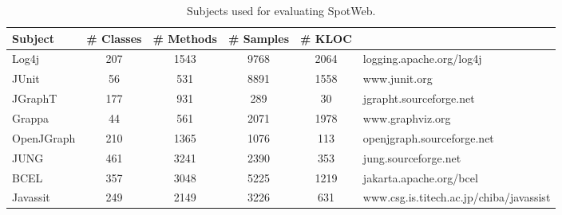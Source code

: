 \setlength{\tabcolsep}{1pt}
\begin{table}[t]
\begin{CodeOut}
\begin{center}
\begin {tabular} {|l|c|c|c|c|l|}
\hline
Subject&\# Classes&\# Methods&\# Samples&\# KLOC&\CenterCell{URL}\\
\hline Log4j&207&1543&9768&2064&logging.apache.org/log4j\\
\hline JUnit&56&531&8891&1558&www.junit.org\\
\hline JGraphT&177&931&289&30&jgrapht.sourceforge.net\\
\hline Grappa&44&561&2071&1978&www.graphviz.org\\
\hline OpenJGraph&210&1365&1076&113&openjgraph.sourceforge.net\\
\hline JUNG&461&3241&2390&353&jung.sourceforge.net\\
\hline BCEL&357&3048&5225&1219&jakarta.apache.org/bcel\\
\hline Javassit&249&2149&3226&631&www.csg.is.titech.ac.jp/chiba/javassist\\
\hline
\end{tabular}
\centering \caption {\label{tab:subjects} Subjects used for evaluating SpotWeb.}
\end{center}
\end{CodeOut}
\end{table}

